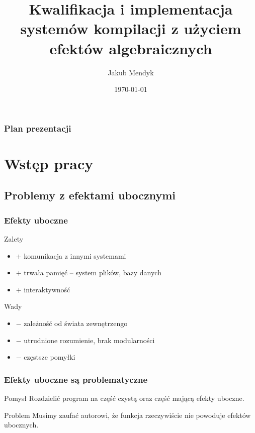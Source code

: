 \documentclass[polish, 13pt]{beamer}
\title[Systemy kompilacji z użyciem efektów algebraicznych i uchwytów]{Kwalifikacja i implementacja systemów kompilacji z użyciem efektów algebraicznych}
\author{Jakub Mendyk}
\date{\today}
\institute[]{Instytut Informatyki Uniwersytetu Wrocławskiego}
\begin{document}
\begin{frame}
\titlepage
\end{frame}

\begin{frame}
\frametitle{Plan prezentacji}
\tableofcontents
\end{frame}

\section{Wstęp pracy}

\subsection{Problemy z efektami ubocznymi}

\newcommand\pro{\item[\textcolor{example text.fg}{$+$}]}
\newcommand\con{\item[\alert{$-$}]}

\begin{frame}
  \frametitle{Efekty uboczne}
  \begin{exampleblock}{Zalety}
    \begin{itemize}
      \pro komunikacja z innymi systemami
      \pro trwała pamięć -- system plików, bazy danych
      \pro interaktywność
    \end{itemize}
  \end{exampleblock}
  \begin{alertblock}{Wady}
    \begin{itemize}
      \con zależność od świata zewnętrzengo
      \con utrudnione rozumienie, brak modularności
      \con częstsze pomyłki
    \end{itemize}
  \end{alertblock}
\end{frame}

\begin{frame}
  \frametitle{Efekty uboczne są problematyczne}
  \begin{exampleblock}{Pomysł}
    Rozdzielić program na część czystą oraz część mającą efekty uboczne.
  \end{exampleblock}
  \pause
  \vspace{1em}
  \begin{alertblock}{Problem}
    Musimy zaufać autorowi, że funkcja rzeczywiście nie powoduje efektów ubocznych.
  \end{alertblock}
\end{frame}
\end{document}
